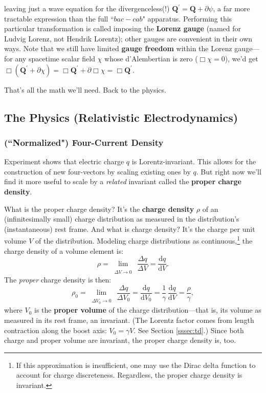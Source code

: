 \documentclass[12pt]{article}
\renewcommand{\vv}[1]{\mathbf{#1}}
\newcommand{\dd}[1]{\mathrm{d}#1}
\begin{document}
leaving just a wave equation for the divergenceless(!) $\vv Q^\prime = \vv Q + \partialup \psi$, a far more tractable expression than the full ``$bac - cab$" apparatus. Performing this particular transformation is called imposing the \textbf{Lorenz gauge} (named for Ludvig Lorenz, not Hendrik Lorentz); other gauges are convenient in their own ways. Note that we still have limited \textbf{gauge freedom} within the Lorenz gauge---for any spacetime scalar field $\chi$ whose d'Alembertian is zero (${\Box \chi = 0}$), we'd get $\Box ( \vv Q^\prime + \partialup \chi ) = \Box \vv Q^\prime + \partialup \Box \chi = \Box \vv Q^\prime$.

That's all the math we'll need. Back to the physics.



\subsection{The Physics (Relativistic Electrodynamics)}

\subsubsection[("Normalized") Four-Current Density]{(``Normalized") Four-Current Density}

Experiment shows that electric charge $q$ is Lorentz-invariant. This allows for the construction of new four-vectors by scaling existing ones by $q$. But right now we'll find it more useful to scale by a \emph{related} invariant called the \textbf{proper charge density}.

What is the proper charge density? It's the \textbf{charge density} $\rho$ of an (infinitesimally small) charge distribution as measured in the distribution's (instantaneous) rest frame. And what is charge density? It's the charge per unit volume $V$ of the distribution. Modeling charge distributions as continuous,\footnote{If this approximation is insufficient, one may use the Dirac delta function to account for charge discreteness. Regardless, the proper charge density is invariant.} the charge density of a volume element is:
\begin{equation*}
\rho = \lim\limits_{\substack{\\ \Delta V \to 0}} \, \dfrac{\Delta q}{\Delta V} = \dfrac{\dd q}{\dd V} .
\end{equation*}
The \emph{proper} charge density is then:
\begin{equation*}
\rho_0 = \lim\limits_{\substack{\\ \Delta V_0 \to 0}} \, \dfrac{\Delta q}{\Delta V_0} = \dfrac{\dd q}{\dd V_0} = \dfrac{1}{\gamma} \, \dfrac{\dd q}{\dd V} = \dfrac{\rho}{\gamma},
\end{equation*}
where $V_0$ is the \textbf{proper volume} of the charge distribution---that is, its volume as measured in its rest frame, an invariant. (The Lorentz factor comes from length contraction along the boost axis: $V_0 = \gamma V$. See Section \ref{sssec:td}.) Since both charge and proper volume are invariant, the proper charge density is, too.
\end{document}

